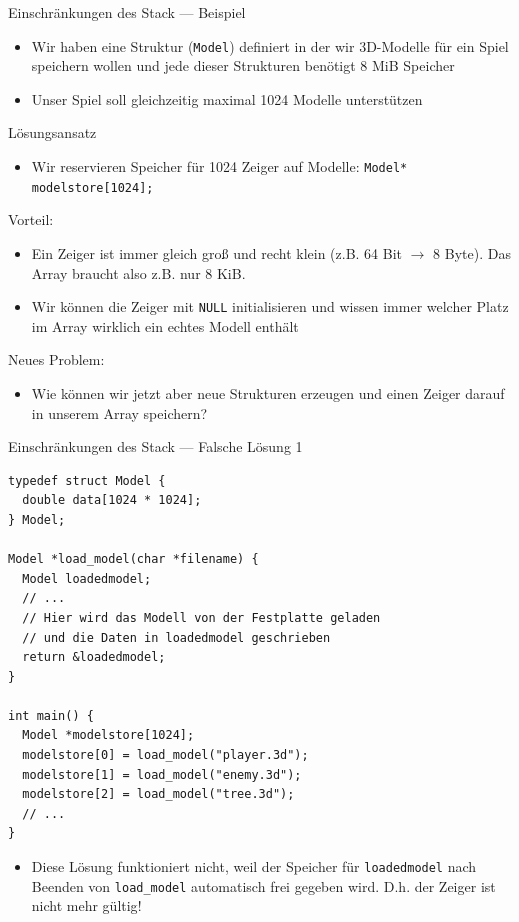 \documentclass[presentation]{beamer}
\begin{document}
\begin{frame}[label={sec:orgec34040},fragile]{Einschränkungen des Stack --- Beispiel}
 \begin{itemize}
\item Wir haben eine Struktur ({\color{solarizedYellow}\texttt{Model}}) definiert in der wir 3D-Modelle
für ein Spiel speichern wollen und jede dieser Strukturen benötigt
8 MiB Speicher
\item Unser Spiel soll gleichzeitig maximal 1024 Modelle unterstützen
\end{itemize}
\begin{exampleblock}{Lösungsansatz}
\begin{itemize}
\item Wir reservieren Speicher für 1024 \alert{Zeiger auf Modelle}: {\color{solarizedYellow}\texttt{Model*
  modelstore[1024];}}
\end{itemize}
\alert{Vorteil:}
\begin{itemize}
\item Ein Zeiger ist immer gleich groß und recht klein (z.B. 64 Bit
\(\rightarrow\) 8 Byte). Das Array braucht also z.B. nur 8 KiB.
\item Wir können die Zeiger mit {\color{solarizedYellow}\texttt{NULL} }initialisieren und wissen immer
welcher Platz im Array wirklich ein echtes Modell enthält
\end{itemize}
\alert{Neues Problem:}
\begin{itemize}
\item Wie können wir jetzt aber \alert{neue Strukturen erzeugen} und einen Zeiger
darauf in unserem Array speichern?
\end{itemize}
\end{exampleblock}
\end{frame}
\begin{frame}[label={sec:org9b8280c},fragile]{Einschränkungen des Stack --- Falsche Lösung 1}
 \begin{verbatim}
typedef struct Model {
  double data[1024 * 1024];
} Model;

Model *load_model(char *filename) {
  Model loadedmodel;
  // ...
  // Hier wird das Modell von der Festplatte geladen
  // und die Daten in loadedmodel geschrieben
  return &loadedmodel;
}

int main() {
  Model *modelstore[1024];
  modelstore[0] = load_model("player.3d");
  modelstore[1] = load_model("enemy.3d");
  modelstore[2] = load_model("tree.3d");
  // ...
}
\end{verbatim}
\begin{itemize}
\item Diese Lösung funktioniert nicht, weil \alert{der Speicher} für
{\color{solarizedYellow}\texttt{loadedmodel} }nach Beenden von {\color{solarizedYellow}\texttt{load\_model} }automatisch \alert{frei
gegeben wird}. D.h. \alert{der Zeiger ist nicht mehr gültig}!
\end{itemize}
\end{frame}
\end{document}
